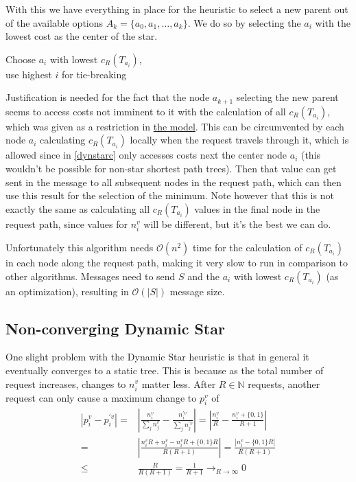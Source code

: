 \documentclass[a4paper, oneside]{discothesis}
\begin{document}
With this we have everything in place for the heuristic to select a new parent out of the available options $A_k=\{a_{0},a_{1},\dots,a_k\}$. We do so by selecting the $a_{i}$ with the lowest cost as the center of the star.

\begin{algorithmic}
\State\Return Choose $a_{i}$ with lowest $c_R(T_{a_{i}})$, \\\qquad use highest $i$ for tie-breaking
\EndFunction
\end{algorithmic}

Justification is needed for the fact that the node $a_{k+1}$ selecting the new parent seems to access costs not imminent to it with the calculation of all $c_R(T_{a_{i}})$, which was given as a restriction in \hyperref[model]{the model}. This can be circumvented by each node $a_{i}$ calculating $c_R(T_{a_{i}})$ locally when the request travels through it, which is allowed since in \autoref{dynstarc} only accesses costs next the center node $a_{i}$ (this wouldn't be possible for non-star shortest path trees). Then that value can get sent in the message to all subsequent nodes in the request path, which can then use this result for the selection of the minimum. Note however that this is not exactly the same as calculating all $c_R(T_{a_{i}})$ values in the final node in the request path, since values for $n_i^v$ will be different, but it's the best we can do.

Unfortunately this algorithm needs $\mathcal{O}(n^2)$ time for the calculation of $c_R(T_{a_i})$ in each node along the request path, making it very slow to run in comparison to other algorithms. Messages need to send $S$ and the $a_{i}$ with lowest $c_R(T_{a_{i}})$ (as an optimization), resulting in $\mathcal{O}(|S|)$ message size.

\subsection{Non-converging Dynamic Star}\label{alg:ncdynstar}

One slight problem with the Dynamic Star heuristic is that in general it eventually converges to a static tree. This is because as the total number of request increases, changes to $n_i^v$ matter less. After $R\in\mathbb{N}$ requests, another request can only cause a maximum change to $p_i^v$ of
\begin{equation}
\begin{split}
\left|p_i^v-p_i^{'v}\right| = & \left|\frac{n_i^v}{\sum_jn_j^v}-\frac{n_i^{'v}}{\sum_jn_j^{'v}}\right| = \left|\frac{n_i^v}{R}-\frac{n_i^v+\{0,1\}}{R+1}\right| \\
= & \left|\frac{n_i^vR+n_i^v-n_i^vR+\{0,1\}R}{R(R+1)}\right| = \frac{\left|n_i^v-\{0,1\}R\right|}{R(R+1)} \\
\leq & \frac{R}{R(R+1)}=\frac{1}{R+1}\to_{R\to\infty} 0
\end{split}
\end{equation}
\end{document}
